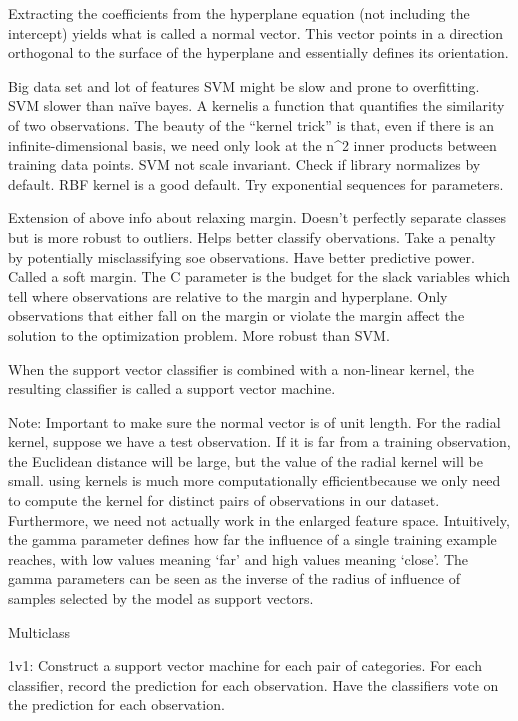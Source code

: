 \documentclass[]{book}
\theoremstyle{definition}
\theoremstyle{definition}
\theoremstyle{definition}
\theoremstyle{remark}
\begin{document}
Extracting the coefficients from the hyperplane equation (not including
the intercept) yields what is called a normal vector. This vector points
in a direction orthogonal to the surface of the hyperplane and
essentially defines its orientation.

Big data set and lot of features SVM might be slow and prone to
overfitting. SVM slower than naïve bayes. A kernelis a function that
quantifies the similarity of two observations. The beauty of the
``kernel trick'' is that, even if there is an infinite-dimensional
basis, we need only look at the n\^{}2 inner products between training
data points. SVM not scale invariant. Check if library normalizes by
default. RBF kernel is a good default. Try exponential sequences for
parameters.

Extension of above info about relaxing margin. Doesn't perfectly
separate classes but is more robust to outliers. Helps better classify
obervations. Take a penalty by potentially misclassifying soe
observations. Have better predictive power. Called a soft margin. The C
parameter is the budget for the slack variables which tell where
observations are relative to the margin and hyperplane. Only
observations that either fall on the margin or violate the margin affect
the solution to the optimization problem. More robust than SVM.

When the support vector classifier is combined with a non-linear kernel,
the resulting classifier is called a support vector machine.

Note: Important to make sure the normal vector is of unit length. For
the radial kernel, suppose we have a test observation. If it is far from
a training observation, the Euclidean distance will be large, but the
value of the radial kernel will be small. using kernels is much more
computationally efficientbecause we only need to compute the kernel for
distinct pairs of observations in our dataset. Furthermore, we need not
actually work in the enlarged feature space. Intuitively, the gamma
parameter defines how far the influence of a single training example
reaches, with low values meaning `far' and high values meaning `close'.
The gamma parameters can be seen as the inverse of the radius of
influence of samples selected by the model as support vectors.

Multiclass

1v1: Construct a support vector machine for each pair of categories. For
each classifier, record the prediction for each observation. Have the
classifiers vote on the prediction for each observation.
\end{document}
